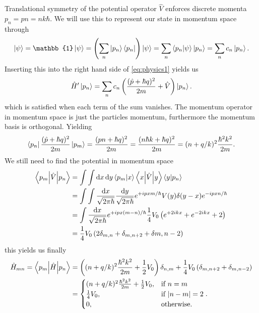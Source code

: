 Translational symmetry of the potential operator $\hat{V}$ enforces discrete
momenta $p_n=pn=nk\hbar$. We will use this to represent our state in momentum
space through
\begin{equation}
  \ket{\psi}
  =\mathbb{1}\ket{\psi}
  =\left(\sum_n\ket{p_n}\bra{p_n}\right)\ket{\psi}
  =\sum_n\braket{p_n}{\psi}\ket{p_n}
  =\sum_nc_n\ket{p_n}
  \label{eq:physics:psimom}.
\end{equation}
Inserting this into the right hand side of \cref{eq:physics1} yields us
\begin{equation}
  \hat{H}^\prime\ket{p_n}
  =\sum_nc_n\left(\frac{(\hat{p}+\hbar q)^2}{2m}+\hat{V}\right)\ket{p_n}
  \label{eq:physics2}.
\end{equation}
which is satisfied when each term of the sum vanishes. The momentum operator
in momentum space is just the particles momentum, furthermore the
momentum basis is orthogonal. Yielding
\begin{equation}
  \bra{p_n}\frac{(\hat{p}+\hbar q)^2}{2m}\ket{p_m}
  =
  \frac{(pn+\hbar q)^2}{2m}
  =
  \frac{(n\hbar k+\hbar q)^2}{2m}
  =
  (n+q/k)^2\frac{\hbar^2k^2}{2m}
  .
\end{equation}
We still need to find the potential in momentum space
\begin{align*}
  \mel**{p_m}{\hat{V}}{p_n}
  &=
  \int\int\dd{x}\dd{y}\braket{p_m}{x}\mel**{x}{\hat{V}}{y}\braket{y}{p_n}\\
  &=
  \int\int\frac{\dd{x}}{\sqrt{2\pi\hbar}}\frac{\dd{y}}{\sqrt{2\pi\hbar}}
  e^{+ipxm/\hbar}V(y)\delta(y-x)e^{-ipxn/\hbar}\\
  &=
  \int\frac{\dd{x}}{\sqrt{2\pi\hbar}}
  e^{+ipx(m-n)/\hbar}\frac{1}{4}V_0\left(e^{+2ikx}+e^{-2ikx}+2\right)\\
  &=
  \frac{1}{4}V_0\left(2\delta_{m,n}+\delta_{m,n+2}+\delta{m,n-2}\right)
\end{align*}
this yields us finally
\begin{align*}
  \hat{H}_{mn}
  =
  \mel**{p_m}{\hat{H}}{p_n}
  &=
  \left((n+q/k)^2\frac{\hbar^2k^2}{2m}+\frac{1}{2}V_0\right)\delta_{n,m}
  +\frac{1}{4}V_0\left(\delta_{m,n+2}+\delta_{m,n-2}\right)\\
  &=
  \begin{cases}
    (n+q/k)^2\frac{\hbar^2k^2}{2m}+\frac{1}{2}V_0, & \text{if } n=m\\
    \frac{1}{4}V_0, & \text{if } \abs{n-m}=2\\
    0, & \text{otherwise}.
  \end{cases}
  .
\end{align*}
